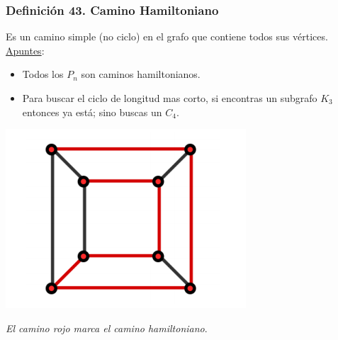 \documentclass{article}
\begin{document}
\subsubsection*{Definición 43. Camino Hamiltoniano}
Es un camino simple (no ciclo) en el grafo que contiene todos sus vértices.
\\\underline{Apuntes}:
\begin{itemize}
    \item Todos los $P_n$ son caminos hamiltonianos.
    \item Para buscar el ciclo de longitud mas corto, si encontras un subgrafo $K_3$ entonces ya está; sino buscas un $C_4$.
\end{itemize}
\begin{minipage}[C]{.30 \textwidth}
    \includegraphics[width=\textwidth]{caminoHamiltoniano.PNG}
\end{minipage}
\begin{minipage}[C]{.70 \textwidth}
    \emph{El camino rojo marca el camino hamiltoniano}.
\end{minipage}
\end{document}
